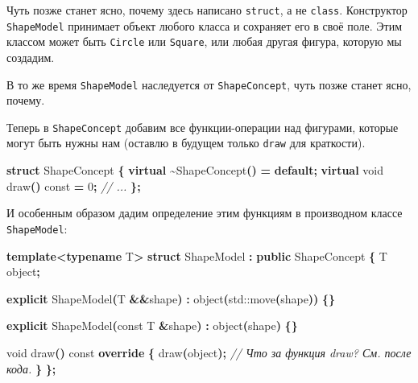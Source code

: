 \documentclass[14pt,a4paper]{article}
\newenvironment{Shaded}{\begin{paragraph}}{\end{paragraph}}
\newenvironment{Highlighting}{\begin{paragraph}}{\end{paragraph}}
\newcommand{\KeywordTok}[1]{\textcolor[rgb]{0.13,0.29,0.53}{\textbf{#1}}}
\newcommand{\DataTypeTok}[1]{\textcolor[rgb]{0.13,0.29,0.53}{#1}}
\newcommand{\DecValTok}[1]{\textcolor[rgb]{0.00,0.00,0.81}{#1}}
\newcommand{\CommentTok}[1]{\textcolor[rgb]{0.56,0.35,0.01}{\textit{#1}}}
\newcommand{\ControlFlowTok}[1]{\textcolor[rgb]{0.13,0.29,0.53}{\textbf{#1}}}
\newcommand{\OperatorTok}[1]{\textcolor[rgb]{0.81,0.36,0.00}{\textbf{#1}}}
\newcommand{\BuiltInTok}[1]{#1}
\newcommand{\AttributeTok}[1]{\textcolor[rgb]{0.77,0.63,0.00}{#1}}
\newcommand{\NormalTok}[1]{#1}
\begin{document}
Чуть позже станет ясно, почему здесь написано \texttt{struct}, а не
\texttt{class}. Конструктор \texttt{ShapeModel} принимает объект любого
класса и сохраняет его в своё поле. Этим классом может быть
\texttt{Circle} или \texttt{Square}, или любая другая фигура, которую мы
создадим.

В то же время \texttt{ShapeModel} наследуется от \texttt{ShapeConcept},
чуть позже станет ясно, почему.

Теперь в \texttt{ShapeConcept} добавим все функции-операции над
фигурами, которые могут быть нужны нам (оставлю в будущем только
\texttt{draw} для краткости).

\begin{Shaded}
\begin{Highlighting}[]
\KeywordTok{struct}\NormalTok{ ShapeConcept }\OperatorTok{\{}
    \KeywordTok{virtual} \OperatorTok{\textasciitilde{}}\NormalTok{ShapeConcept}\OperatorTok{()} \OperatorTok{=} \ControlFlowTok{default}\OperatorTok{;}
    \KeywordTok{virtual} \DataTypeTok{void}\NormalTok{ draw}\OperatorTok{()} \AttributeTok{const} \OperatorTok{=} \DecValTok{0}\OperatorTok{;}
    \CommentTok{// ...}
\OperatorTok{\};}
\end{Highlighting}
\end{Shaded}

И особенным образом дадим определение этим функциям в производном классе
\texttt{ShapeModel}:

\begin{Shaded}
\begin{Highlighting}[]
\KeywordTok{template}\OperatorTok{\textless{}}\KeywordTok{typename}\NormalTok{ T}\OperatorTok{\textgreater{}}
\KeywordTok{struct}\NormalTok{ ShapeModel }\OperatorTok{:} \KeywordTok{public}\NormalTok{ ShapeConcept }\OperatorTok{\{}
\NormalTok{    T object}\OperatorTok{;}

    \KeywordTok{explicit}\NormalTok{ ShapeModel}\OperatorTok{(}\NormalTok{T }\OperatorTok{\&\&}\NormalTok{shape}\OperatorTok{)} \OperatorTok{:}\NormalTok{ object}\OperatorTok{(}\BuiltInTok{std::}\NormalTok{move}\OperatorTok{(}\NormalTok{shape}\OperatorTok{))} \OperatorTok{\{\}}

    \KeywordTok{explicit}\NormalTok{ ShapeModel}\OperatorTok{(}\AttributeTok{const}\NormalTok{ T }\OperatorTok{\&}\NormalTok{shape}\OperatorTok{)} \OperatorTok{:}\NormalTok{ object}\OperatorTok{(}\NormalTok{shape}\OperatorTok{)} \OperatorTok{\{\}}

    \DataTypeTok{void}\NormalTok{ draw}\OperatorTok{()} \AttributeTok{const} \KeywordTok{override} \OperatorTok{\{}
\NormalTok{        draw}\OperatorTok{(}\NormalTok{object}\OperatorTok{);} \CommentTok{// Что за функция draw? См. после кода.}
    \OperatorTok{\}}
\OperatorTok{\};}
\end{Highlighting}
\end{Shaded}
\end{document}
